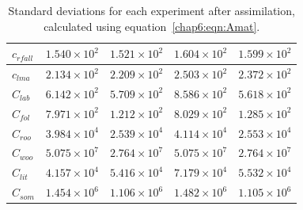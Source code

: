 \begin{table}[ht]
\begin{center}
\begin{tabular}{| l | l | l | l | l |}
$c_{rfall}$ & $1.540\times 10^{2}$ & $1.521\times 10^{2}$ & $1.604\times 10^{2}$ & $1.599\times 10^{2}$ \\ \hline
$c_{lma}$ & $2.134\times 10^{2}$ & $2.209\times 10^{2}$ & $2.503\times 10^{2}$ & $2.372\times 10^{2}$ \\ \hline
$C_{lab}$ & $6.142\times 10^{2}$ & $5.709\times 10^{2}$ & $8.586\times 10^{2}$ & $5.618\times 10^{2}$ \\ \hline
$C_{fol}$ & $7.971\times 10^{2}$ & $1.212\times 10^{2}$ & $8.029\times 10^{2}$ & $1.285\times 10^{2}$ \\ \hline
$C_{roo}$ & $3.984\times 10^{4}$ & $2.539\times 10^{4}$ & $4.114\times 10^{4}$ & $2.553\times 10^{4}$ \\ \hline
$C_{woo}$ & $5.075\times 10^{7}$ & $2.764\times 10^{7}$ & $5.075\times 10^{7}$ & $2.764\times 10^{7}$ \\ \hline
$C_{lit}$ & $4.157\times 10^{4}$ & $5.416\times 10^{4}$ & $7.179\times 10^{4}$ & $5.532\times 10^{4}$ \\ \hline
$C_{som}$ & $1.454\times 10^{6}$ & $1.106\times 10^{6}$ & $1.482\times 10^{6}$ & $1.105\times 10^{6}$  \\ \hline
	\end{tabular}
	\caption{Standard deviations for each experiment after assimilation, calculated using equation~\ref{chap6:eqn:Amat}.}
	\label{chap6:table:expvars}
\end{center} 
\end{table}
